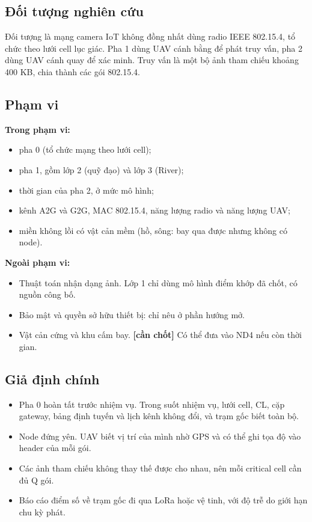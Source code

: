 \subsection{Đối tượng nghiên cứu}

Đối tượng là mạng camera IoT không đồng nhất dùng radio IEEE 802.15.4,
tổ chức theo lưới cell lục giác. Pha 1 dùng UAV cánh bằng để phát truy
vấn, pha 2 dùng UAV cánh quay để xác minh. Truy vấn là một bộ ảnh tham
chiếu khoảng 400 KB, chia thành các gói 802.15.4.

\subsection{Phạm vi}

\textbf{Trong phạm vi:}

\begin{itemize}
\tightlist
\item
  pha 0 (tổ chức mạng theo lưới cell);
\item
  pha 1, gồm lớp 2 (quỹ đạo) và lớp 3 (River);
\item
  thời gian của pha 2, ở mức mô hình;
\item
  kênh A2G và G2G, MAC 802.15.4, năng lượng radio và năng lượng UAV;
\item
  miền không lồi có vật cản mềm (hồ, sông: bay qua được nhưng không có
  node).
\end{itemize}

\textbf{Ngoài phạm vi:}

\begin{itemize}
\tightlist
\item
  Thuật toán nhận dạng ảnh. Lớp 1 chỉ dùng mô hình điểm khớp đã chốt, có
  nguồn công bố.
\item
  Bảo mật và quyền sở hữu thiết bị: chỉ nêu ở phần hướng mở.
\item
  Vật cản cứng và khu cấm bay. \textbf{{[}cần chốt{]}} Có thể đưa vào
  ND4 nếu còn thời gian.
\end{itemize}

\subsection{Giả định chính}

\begin{itemize}
\tightlist
\item
  Pha 0 hoàn tất trước nhiệm vụ. Trong suốt nhiệm vụ, lưới cell, CL, cặp
  gateway, bảng định tuyến và lịch kênh không đổi, và trạm gốc biết toàn
  bộ.
\item
  Node đứng yên. UAV biết vị trí của mình nhờ GPS và có thể ghi tọa độ
  vào header của mỗi gói.
\item
  Các ảnh tham chiếu không thay thế được cho nhau, nên mỗi critical cell
  cần đủ Q gói.
\item
  Báo cáo điểm số về trạm gốc đi qua LoRa hoặc vệ tinh, với độ trễ do
  giới hạn chu kỳ phát.
\end{itemize}

